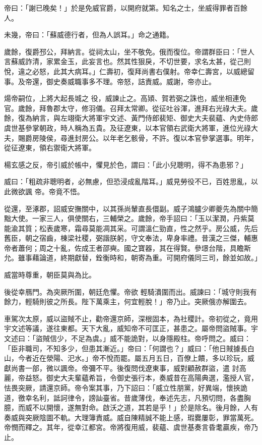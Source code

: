 \begin{pinyinscope}
 帝曰：「謝已晚矣！」於是免威官爵，以開府就第。知名之士，坐威得罪者百餘人。



 未幾，帝曰：「蘇威德行者，但為人誤耳。」命之通籍。



 歲餘，復爵邳公，拜納言。從祠太山，坐不敬免。俄而復位。帝謂群臣曰：「世人言蘇威詐清，家累金玉，此妄言也。然其性狠戾，不切世要，求名太甚，從己則悅，違之必怒，此其大病耳。」仁壽初，復拜尚書右僕射。帝幸仁壽宮，以威總留事。及帝還，御史奏威職事多不理。帝怒，詰責威。威謝，帝亦止。



 煬帝嗣位，上將大起長城之
 役，威諫止之。高熲、賀若弼之誅也，威坐相連免官。歲餘，拜魯郡太守，修羽儀。召拜太常卿。從征吐谷渾，進拜右光祿大夫。歲餘，復為納言，與左翊衛大將軍宇文述、黃門侍郎裴矩、御史大夫裴蘊、內史侍郎虞世基參掌朝政，時人稱為五貴。及征遼東，以本官領右武衛大將軍，進位光祿大夫，賜爵房陵侯，尋進封房公。以年老乞骸骨，不許。復以本官參掌選事。明年，從征遼東，領右禦衛大將軍。



 楊玄感之反，帝引威於帳中，懼見於色，謂曰：「此小兒聰明，得不為患邪？」



 威曰：「粗疏非聰明者，必無慮，但恐浸成亂階耳。」威見勞役不已，百姓思亂，以此微欲諷
 帝。帝竟不悟。



 從還，至涿郡，詔威安撫關中，以其孫尚輦直長儇副。威子鴻臚少卿夔先為關中簡黜大使。一家三人，俱使關右，三輔榮之。歲餘，帝手詔曰：「玉以潔潤，丹紫莫能渝其質；松表歲寒，霜尋莫能凋其采。可謂溫仁勁直，性之然乎。房公威，先后舊臣，朝之宿齒，棟梁社稷，弼諧朕躬，守文奉法，卑身率禮。昔漢之三傑，輔惠帝者蕭何；周之十亂，佐成王者邵奭。國之寶器，其在得賢。參璟台階，具瞻斯允。雖事藉論道，終期獻替，銓衡時和，朝寄為重。可開府儀同三司，餘並如故。」



 威當時尊重，朝臣莫與為比。



 後從幸鴈門。為突厥所圍，朝廷危懼。帝欲
 輕騎潰圍而出。威諫曰：「城守則我有餘力，輕騎則彼之所長。陛下萬乘主，何宜輕脫！」帝乃止。突厥俄亦解圍去。



 車駕次太原，威以盜賊不止，勸帝還京師，深根固本，為社稷計。帝初從之，竟用宇文述等議，遂往東都。天下大亂，威知帝不可匡正，甚患之。屬帝問盜賊事。宇文述曰：「盜賊信少，不足為虞。」威不能詭對，以身隱殿柱。帝呼問之。威曰：「臣非職司，不知多少，但患其漸近。」帝曰：「何謂也？」威曰：「他日賊據長白山，今者近在滎陽、汜水。」帝不悅而罷。屬五月五日，百僚上饋，多以珍玩，威獻尚書一部，微以諷帝。帝彌不平。後復問伐遼東事，威對顧赦群盜，遣
 討高麗，帝益怒。御史大夫輩蘊希旨，令御史張行本，奏威昔在高陽典選，濫授人官，怯畏突厥，請還京師。帝令案其事，乃下詔曰：「威立性朋黨，好異端，懷挾詭道，徼幸名利，詆訶律令，謗訕臺省。昔歲薄伐，奉述先志，凡預切問，各盡胸臆，而威不以開懷，遂無對命。啟沃之道，其若是乎！」於是除名。後月餘，人有奏威與突厥陰圖不軌。大理簿責威。威自陳精誠不能上感，瑕爨屢彰，罪當萬死。帝憫而釋之。其年，從幸江都宮。帝將復用威，裴蘊、虞世基奏言昏耄贏疾，帝乃止。




\end{pinyinscope}
